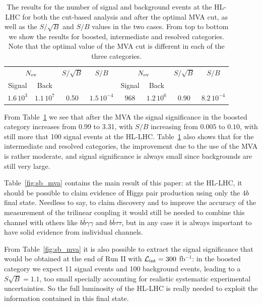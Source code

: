 \begin{table}[t]
\begin{tabular}{c|c|c|c||c|c|c|c}
    \hline
    \multicolumn{2}{c|}{$N_{\rm ev}$} &  $S/\sqrt{B}$  & $S/B$
    & \multicolumn{2}{c|}{$N_{\rm ev}$} &  $S/\sqrt{B}$  & $S/B$\\
        Signal & Back   &     &   &  Signal & Back   &     &    \\
    \hline
    $1.6\,10^{3}$   &   $1.1\,10^{7}$   & 0.50     &  $1.5\,10^{-4}$   & 968 &
    $1.2\,10^{6}$  & 0.90 & $8.2\,10^{-4}$ \\
        \hline
  \end{tabular}
  \caption{\small The results for the number of signal and
    background events
    at the HL-LHC for both the cut-based analysis and after the
    optimal MVA cut, as well as the $S/\sqrt{B}$ and $S/B$
    values in the two cases.
    From top to bottom we show the results for boosted,
    intermediate and resolved categories.
    Note that the optimal value of the MVA cut
    is different in each of the three categories.
    \label{table:cutflowMVA}
  }
\end{table}

From Table~\ref{table:cutflowMVA} we see that after the
MVA the signal significance in the boosted category increases
from 0.99 to 3.31, with $S/B$ increasing from $0.005$ to $0.10$,
with still more that 100 signal events at the HL-LHC.
%
Table~\ref{table:cutflowMVA} also shows that for the intermediate
and resolved categories, the improvement due to the use
of the MVA is rather moderate, and signal significance is always
small since backgrounds are still very large.

Table~\ref{fig:sb_mva} contains the main result of this paper:
at the HL-LHC, it should be possible to claim evidence of
Higgs pair production using only the $4b$ final state.
%
Needless to say, to claim discovery and to improve the accuracy
of the measurement of the trilinear coupling it would still
be needed to combine this channel with others like
$b\bar{b}\gamma\gamma$ and $b\bar{b}\tau\tau$, but in any case
it is always important to have solid evidence from
individual channels.

From Table~\ref{fig:sb_mva} it is also possible to
extract the signal significance that would be obtained
at the end of Run II with $\mathcal{L}_{\rm int}=300$ fb$^{-1}$:
in the boosted category we expect 11 signal events and 100 background
events, leading to a $S\sqrt{B}=1.1$, too small specially accounting
for realistic systematic experimental uncertainties.
%
So the full luminosity of the HL-LHC is really needed to exploit
the information contained in this final state.

